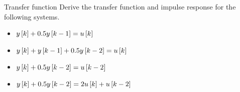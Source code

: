 \documentclass[aspectratio=169]{beamer}
\def\ls{\ensuremath\left[}
\def\rs{\ensuremath\right]}
\begin{document}
\begin{frame}{Transfer function}
Derive the transfer function and impulse response for the following systems.
\begin{itemize}
    \item $y\ls k\rs + 0.5y\ls k - 1\rs = u\ls k\rs$
    \item $y\ls k\rs + y\ls k - 1\rs + 0.5y\ls k - 2\rs = u\ls k\rs$
    \item $y\ls k\rs + 0.5y\ls k - 2\rs = u\ls k - 2\rs$
    \item $y\ls k\rs + 0.5y\ls k - 2\rs = 2u\ls k\rs + u\ls k - 2\rs$
\end{itemize}
\end{frame}
\end{document}
